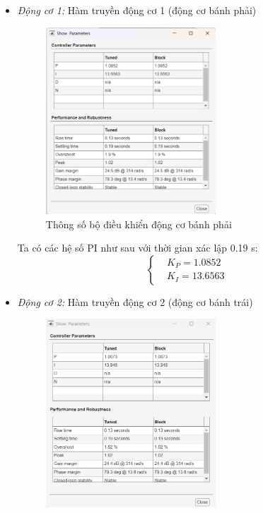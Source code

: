           \begin{itemize}
               \item \textit{Động cơ 1:} Hàm truyền động cơ 1 (động cơ bánh phải)
               \begin{figure}[H]
                    \centering
                    \includegraphics[width=0.6\textwidth]{pictures/chapter6/params_JGB1.png}
                    \caption{Thông số bộ điều khiển động cơ bánh phải}
                    \label{params_JGB1}
               \end{figure}
               Ta có các hệ số PI như sau với thời gian xác lập 0.19 s:
               \begin{equation*}
                    \begin{cases}
                         &K_P = 1.0852 \\ 
                         &K_I = 13.6563
                    \end{cases}
               \end{equation*} 
               \item \textit{Động cơ 2:} Hàm truyền động cơ 2 (động cơ bánh trái)\\
               \begin{figure}[H]
                    \centering
                    \includegraphics[width=0.6\textwidth]{pictures/chapter6/params_JGB2.png}

\end{figure}
\end{itemize}
